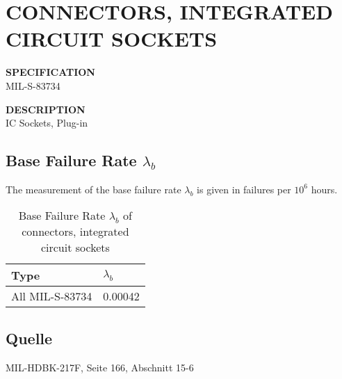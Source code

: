 \section{CONNECTORS, INTEGRATED CIRCUIT SOCKETS}

\begin{minipage}[t]{0.29\textwidth}
    \textbf{SPECIFICATION}\\
    MIL-S-83734
\end{minipage}
\begin{minipage}[t]{0.7\textwidth}
    \textbf{DESCRIPTION}\\
    IC Sockets, Plug-in
\end{minipage}

\subsection{Base Failure Rate $\lambda_b$}
The measurement of the base failure rate $\lambda_b$ is given in failures per $10^6$ hours.
\begin{table}[ht]
{\centering

\begin{tabular}{|p{7.5cm}|p{5cm}|}
    \hline
    \textbf{Type} & \textbf{$\lambda_b$} \\
    \hline
    All MIL-S-83734 & 0.00042 \\
    \hline
\end{tabular}

\caption{Base Failure Rate $\lambda_b$ of connectors, integrated circuit sockets}

\label{tab:bfr_connectors_integrated_circuit_sockets}
\par}
\end{table}
\subsection*{Quelle}
MIL-HDBK-217F, Seite 166, Abschnitt 15-6